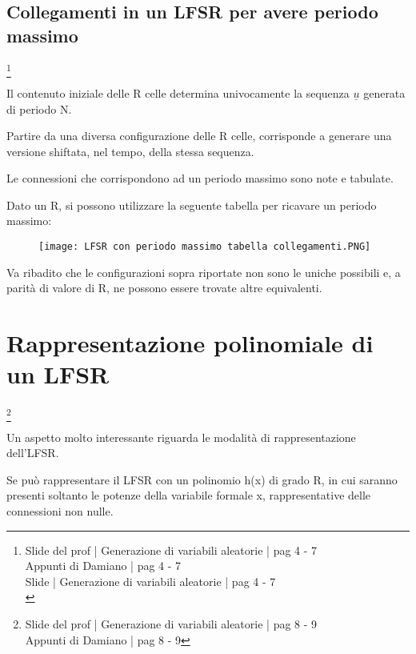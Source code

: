 \newpage 

\subsection{Collegamenti in un LFSR per avere periodo massimo}
\footnote{Slide del prof | Generazione di variabili aleatorie | pag 4 - 7 \\
Appunti di Damiano | pag 4 - 7 \\ 
Slide | Generazione di variabili aleatorie | pag  4 - 7\\ 
} 

Il contenuto iniziale delle R celle determina univocamente la sequenza $\underline{u}$ 
generata di periodo N. \newline 

Partire da una diversa configurazione delle R celle, 
corrisponde a generare una versione shiftata, nel tempo, della stessa sequenza. \newline 

Le connessioni che corrispondono ad un periodo massimo sono note e tabulate. \newline 

Dato un R, si possono utilizzare la seguente tabella per ricavare un periodo massimo: 

\begin{figure}[h]
    \centering
    \texttt{[image: LFSR con periodo massimo tabella collegamenti.PNG]}
\end{figure}

Va ribadito che le configurazioni sopra riportate non sono le uniche possibili e, 
a parità di valore di R, 
ne possono essere trovate altre equivalenti. \newline 

\newpage 

\section{Rappresentazione polinomiale di un LFSR}
\footnote{Slide del prof | Generazione di variabili aleatorie | pag 8 - 9 \\
Appunti di Damiano | pag 8 - 9
} 

Un aspetto molto interessante riguarda le modalità di rappresentazione dell'LFSR. \newline 

Se può rappresentare il LFSR con un polinomio h(x) di grado R, 
in cui saranno presenti soltanto le potenze della variabile formale x, 
rappresentative delle connessioni non nulle. \newline 

